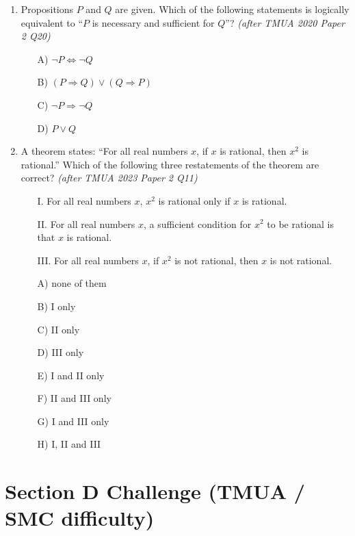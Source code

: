\documentclass[11pt,a4paper]{article}
\begin{document}
\begin{enumerate}
\item Propositions $P$ and $Q$ are given. Which of the following statements is logically equivalent to ``$P$ is necessary and sufficient for $Q$''? \textit{\small(after TMUA 2020 Paper 2 Q20)}
\begin{itemize}
\item[A)] $\neg P \iff \neg Q$
\item[B)] $(P \Rightarrow Q) \lor (Q \Rightarrow P)$
\item[C)] $\neg P \Rightarrow \neg Q$
\item[D)] $P \lor Q$
\end{itemize}

\item A theorem states: ``For all real numbers $x$, if $x$ is rational, then $x^2$ is rational.'' Which of the following three restatements of the theorem are correct? \textit{\small(after TMUA 2023 Paper 2 Q11)}
\begin{itemize}
\item[I.] For all real numbers $x$, $x^2$ is rational only if $x$ is rational.
\item[II.] For all real numbers $x$, a sufficient condition for $x^2$ to be rational is that $x$ is rational.
\item[III.] For all real numbers $x$, if $x^2$ is not rational, then $x$ is not rational.
\end{itemize}
\begin{itemize}
\item[A)] none of them
\item[B)] I only
\item[C)] II only
\item[D)] III only
\item[E)] I and II only
\item[F)] II and III only
\item[G)] I and III only
\item[H)] I, II and III
\end{itemize}

\end{enumerate}

\section*{Section D \quad Challenge \hfill{\normalfont\small(TMUA / SMC difficulty)}}
\end{document}
